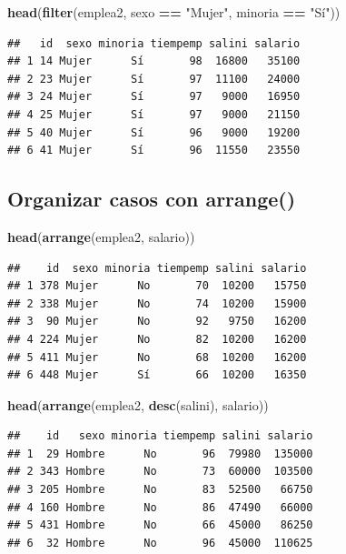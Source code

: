 \documentclass[]{book}
\newenvironment{Shaded}{\begin{snugshade}}{\end{snugshade}}
\newcommand{\KeywordTok}[1]{\textcolor[rgb]{0.13,0.29,0.53}{\textbf{#1}}}
\newcommand{\NormalTok}[1]{#1}
\newcommand{\OperatorTok}[1]{\textcolor[rgb]{0.81,0.36,0.00}{\textbf{#1}}}
\newcommand{\StringTok}[1]{\textcolor[rgb]{0.31,0.60,0.02}{#1}}
\begin{document}
\begin{Shaded}
\begin{Highlighting}[]
\KeywordTok{head}\NormalTok{(}\KeywordTok{filter}\NormalTok{(emplea2, sexo }\OperatorTok{==}\StringTok{ "Mujer"}\NormalTok{, minoria }\OperatorTok{==}\StringTok{ "Sí"}\NormalTok{))}
\end{Highlighting}
\end{Shaded}

\begin{verbatim}
##   id  sexo minoria tiempemp salini salario
## 1 14 Mujer      Sí       98  16800   35100
## 2 23 Mujer      Sí       97  11100   24000
## 3 24 Mujer      Sí       97   9000   16950
## 4 25 Mujer      Sí       97   9000   21150
## 5 40 Mujer      Sí       96   9000   19200
## 6 41 Mujer      Sí       96  11550   23550
\end{verbatim}

\hypertarget{organizar-casos-con-arrange}{%
\subsection{\texorpdfstring{Organizar casos con \textbf{arrange()}}{Organizar casos con arrange()}}\label{organizar-casos-con-arrange}}

\begin{Shaded}
\begin{Highlighting}[]
\KeywordTok{head}\NormalTok{(}\KeywordTok{arrange}\NormalTok{(emplea2, salario))}
\end{Highlighting}
\end{Shaded}

\begin{verbatim}
##    id  sexo minoria tiempemp salini salario
## 1 378 Mujer      No       70  10200   15750
## 2 338 Mujer      No       74  10200   15900
## 3  90 Mujer      No       92   9750   16200
## 4 224 Mujer      No       82  10200   16200
## 5 411 Mujer      No       68  10200   16200
## 6 448 Mujer      Sí       66  10200   16350
\end{verbatim}

\begin{Shaded}
\begin{Highlighting}[]
\KeywordTok{head}\NormalTok{(}\KeywordTok{arrange}\NormalTok{(emplea2, }\KeywordTok{desc}\NormalTok{(salini), salario))}
\end{Highlighting}
\end{Shaded}

\begin{verbatim}
##    id   sexo minoria tiempemp salini salario
## 1  29 Hombre      No       96  79980  135000
## 2 343 Hombre      No       73  60000  103500
## 3 205 Hombre      No       83  52500   66750
## 4 160 Hombre      No       86  47490   66000
## 5 431 Hombre      No       66  45000   86250
## 6  32 Hombre      No       96  45000  110625
\end{verbatim}
\end{document}

